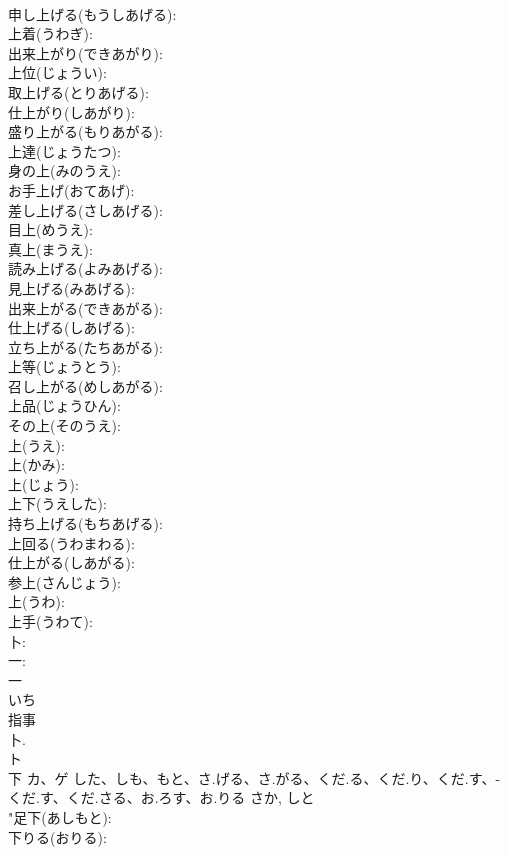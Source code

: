\documentclass[8pt]{extreport}
\begin{document}
\begin{CJK}{UTF8}{min}
\\	申し上げる(もうしあげる): 
\\	上着(うわぎ): 
\\	出来上がり(できあがり): 
\\	上位(じょうい): 
\\	取上げる(とりあげる): 
\\	仕上がり(しあがり): 
\\	盛り上がる(もりあがる): 
\\	上達(じょうたつ): 
\\	身の上(みのうえ): 
\\	お手上げ(おてあげ): 
\\	差し上げる(さしあげる): 
\\	目上(めうえ): 
\\	真上(まうえ): 
\\	読み上げる(よみあげる): 
\\	見上げる(みあげる): 
\\	出来上がる(できあがる): 
\\	仕上げる(しあげる): 
\\	立ち上がる(たちあがる): 
\\	上等(じょうとう): 
\\	召し上がる(めしあがる): 
\\	上品(じょうひん): 
\\	その上(そのうえ): 
\\	上(うえ): 
\\	上(かみ): 
\\	上(じょう): 
\\	上下(うえした): 
\\	持ち上げる(もちあげる): 
\\	上回る(うわまわる): 
\\	仕上がる(しあがる): 
\\	参上(さんじょう): 
\\	上(うわ): 
\\	上手(うわて): 
\\	卜: 
\\	一: 
\\	一	
\\	いち	
\\	指事 
\\	卜. 
\\	ト
\\	下	カ、ゲ	した、しも、もと、さ.げる、さ.がる、くだ.る、くだ.り、くだ.す、-くだ.す、くだ.さる、お.ろす、お.りる	さか, しと	
\\	"足下(あしもと): 
\\	下りる(おりる): 

\end{CJK}
\end{document}
